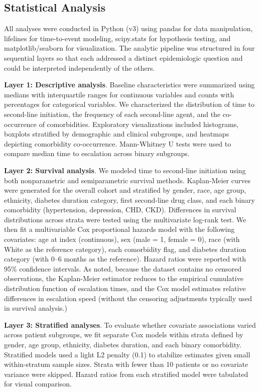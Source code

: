 \documentclass[twoside,11pt]{article}
\begin{document}
\subsection*{Statistical Analysis}

All analyses were conducted in Python (v3) using pandas for data manipulation, lifelines for time-to-event modeling, scipy.stats for hypothesis testing, and matplotlib/seaborn for visualization. The analytic pipeline was structured in four sequential layers so that each addressed a distinct epidemiologic question and could be interpreted independently of the others.

\textbf{Layer 1: Descriptive analysis}. Baseline characteristics were summarized using medians with interquartile ranges for continuous variables and counts with percentages for categorical variables. We characterized the distribution of time to second-line initiation, the frequency of each second-line agent, and the co-occurrence of comorbidities. Exploratory visualizations included histograms, boxplots stratified by demographic and clinical subgroups, and heatmaps depicting comorbidity co-occurrence. Mann-Whitney U tests were used to compare median time to escalation across binary subgroups.

\textbf{Layer 2: Survival analysis}. We modeled time to second-line initiation using both nonparametric and semiparametric survival methods. Kaplan-Meier curves were generated for the overall cohort and stratified by gender, race, age group, ethnicity, diabetes duration category, first second-line drug class, and each binary comorbidity (hypertension, depression, CHD, CKD). Differences in survival distributions across strata were tested using the multivariate log-rank test. We then fit a multivariable Cox proportional hazards model with the following covariates: age at index (continuous), sex (male = 1, female = 0), race (with White as the reference category), each comorbidity flag, and diabetes duration category (with 0–6 months as the reference). Hazard ratios were reported with 95\% confidence intervals. As noted, because the dataset contains no censored observations, the Kaplan-Meier estimator reduces to the empirical cumulative distribution function of escalation times, and the Cox model estimates relative differences in escalation speed (without the censoring adjustments typically used in survival analysis.)

\textbf{Layer 3: Stratified analyses}. To evaluate whether covariate associations varied across patient subgroups, we fit separate Cox models within strata defined by gender, age group, ethnicity, diabetes duration, and each binary comorbidity. Stratified models used a light L2 penalty (0.1) to stabilize estimates given small within-stratum sample sizes. Strata with fewer than 10 patients or no covariate variance were skipped. Hazard ratios from each stratified model were tabulated for visual comparison.
\end{document}
